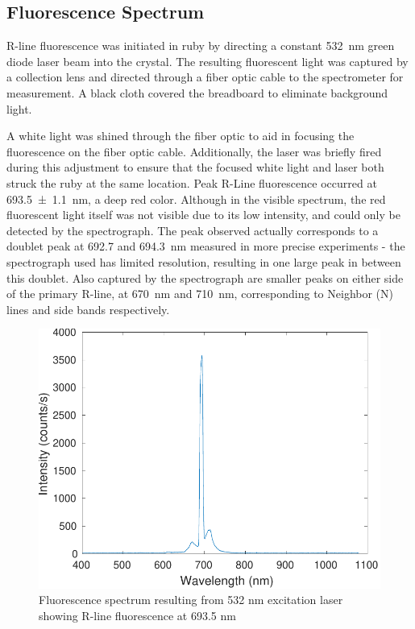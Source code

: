\documentclass[11pt, a4paper, twocolumn]{article}
\begin{document}
\subsection*{Fluorescence Spectrum}
R-line fluorescence was initiated in ruby by directing a constant \SI{532}{\nm} green diode laser beam into the crystal. The resulting fluorescent light was captured by a collection lens and directed through a fiber optic cable to the spectrometer for measurement. A black cloth covered the breadboard to eliminate background light.

A white light was shined through the fiber optic to aid in focusing the fluorescence on the fiber optic cable. Additionally, the laser was briefly fired during this adjustment to ensure that the focused white light and laser both struck the ruby at the same location.
Peak R-Line fluorescence occurred at \SI{693.5\pm1.1}{\nm}, a deep red color. Although in the visible spectrum, the red fluorescent light itself was not visible due to its low intensity, and could only be detected by the spectrograph. The peak observed actually corresponds to a doublet peak at 692.7 and \SI{694.3}{\nm} measured in more precise experiments -  the spectrograph used has limited resolution, resulting in one large peak in between this doublet. Also captured by the spectrograph are smaller peaks on either side of the primary R-line, at \SI{670}{\nm} and \SI{710}{\nm}, corresponding to Neighbor (N) lines and side bands respectively.

\begin{figure}[H]
\includegraphics[width=\linewidth]{fluorescenceSpectrum.pdf}
\caption{Fluorescence spectrum resulting from 532 nm excitation laser showing R-line fluorescence at 693.5 nm}
\label{fig:intensities}
\end{figure}
\end{document}
